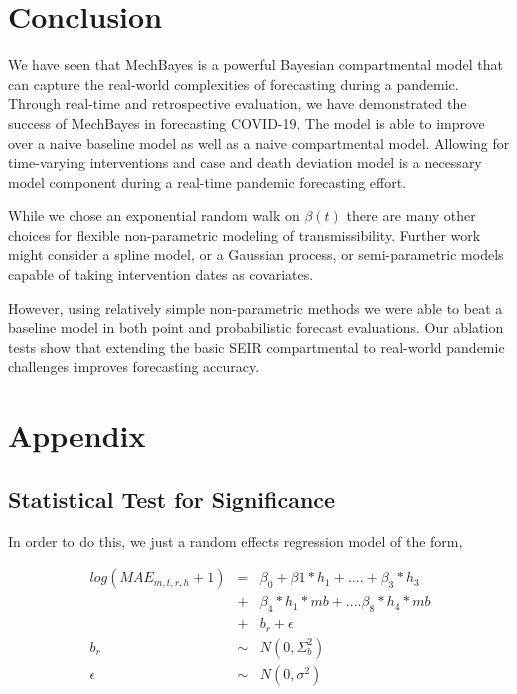 \documentclass[11pt]{amsart}
\begin{document}
\begin{itemize}
\end{itemize}







\section{Conclusion}

We have seen that MechBayes is a powerful Bayesian compartmental model that can capture the real-world complexities of forecasting during a pandemic. Through real-time and retrospective evaluation, we have demonstrated the success of MechBayes in forecasting COVID-19. The model is able to improve over a naive baseline model as well as a naive compartmental model. Allowing for time-varying interventions and case and death deviation model is a necessary model component during a real-time pandemic forecasting effort. 

While we chose an exponential random walk on $\beta(t)$ there are many other choices for flexible non-parametric modeling of transmissibility. Further work might consider a spline model, or a Gaussian process, or semi-parametric models capable of taking intervention dates as covariates. 

However, using relatively simple non-parametric methods we were able to beat a baseline model in both point and probabilistic forecast evaluations. Our ablation tests show that extending the basic SEIR compartmental to real-world pandemic challenges improves forecasting accuracy. 


\newpage

\section{Appendix}
\subsection{Statistical Test for Significance}
In order to do this, we just a random effects regression model of the form,

\begin{eqnarray*}
log(MAE_{m,t,r,h} +1) &=& \beta_0 +  \beta1*h_1 + ....+ \beta_3*h_3 \\
&+& \beta_4 *h_1*mb + .... \beta_8*h_4*mb\\
 &+& b_{r} + \epsilon \\
b_{r} &\sim &N(0,\Sigma_b^2)\\
\epsilon &\sim& N(0,\sigma^2)
\end{eqnarray*}
\end{document}
